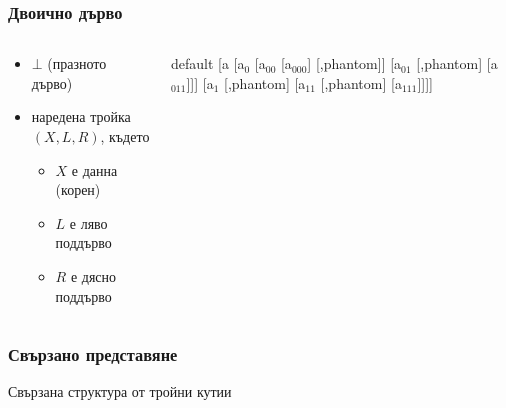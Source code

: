 \documentclass[alsotrans,beameroptions={aspectratio=169}]{beamerswitch}
\newcommand{\samplebintree}{%
      \begin{forest}
        default
        [a [a$_0$ [a$_{00}$ [a$_{000}$] [,phantom]] [a$_{01}$ [,phantom] [a$_{011}$]]] [a$_1$ [,phantom] [a$_{11}$ [,phantom] [a$_{111}$]]]]
      \end{forest}%
}
\begin{document}
\begin{frame}
  \frametitle{Двоично дърво}
  \begin{columns}[t,onlytextwidth]
    \begin{column}{0.5\textwidth}
      \begin{definition}
        \begin{itemize}
        \item $\bot$ (празното дърво)
        \item наредена тройка $(X, L, R)$, където
          \begin{itemize}
          \item $X$ е данна (корен)
          \item $L$ е ляво поддърво
          \item $R$ е дясно поддърво
          \end{itemize}
        \end{itemize}
      \end{definition}
    \end{column}
    \begin{column}{0.5\textwidth}
      \vspace{4ex}
      \begin{center}
        \samplebintree
      \end{center}
    \end{column}
  \end{columns}
\end{frame}

\begin{frame}
  \frametitle{Свързано представяне}
  Свързана структура от тройни кутии\\[6ex]
  \begin{center}
    \small
  \end{center}
\end{frame}
\end{document}
